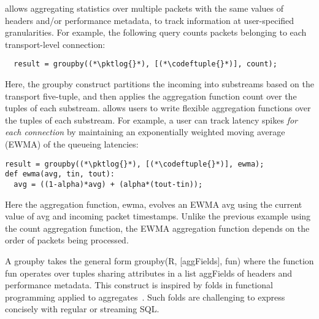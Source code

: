  \TheSystem allows
aggregating statistics over multiple packets with the same values of headers
and/or performance metadata, to track information at user-specified
granularities. For example, the following query counts packets belonging to each
transport-level connection:
\begin{lstlisting}
  result = groupby((*\pktlog{}*), [(*\codeftuple{}*)], count);
\end{lstlisting}
Here, the {\ct groupby} construct partitions the incoming {\ct \pktlog} into
substreams based on the transport five-tuple, and then applies the aggregation
function {\ct count} over the tuples of each substream.
\TheSystem allows users to write flexible aggregation functions over the
tuples of each substream. For example, a user can track latency spikes {\em
for each connection} by maintaining an exponentially weighted moving average
(EWMA) of the queueing latencies:
\begin{lstlisting}
result = groupby((*\pktlog{}*), [(*\codeftuple{}*)], ewma);
def ewma(avg, tin, tout):
  avg = ((1-alpha)*avg) + (alpha*(tout-tin));
\end{lstlisting}
Here the aggregation function, {\ct ewma}, evolves an EWMA {\ct avg} using the
current value of {\ct avg} and incoming packet timestamps. Unlike the previous
example using the {\ct count} aggregation function, the EWMA aggregation
function depends on the order of packets being processed.

A {\ct groupby} takes the general form {\ct groupby(R, [aggFields], fun)} where
the function {\ct fun} operates over tuples sharing attributes in a list {\ct
  aggFields} of headers and performance metadata. This construct is inspired by
{\ct fold}s in functional programming applied to
aggregates~\cite{comprehensive-comprehensions}. Such {\ct fold}s are challenging
to express concisely with regular or streaming SQL.

